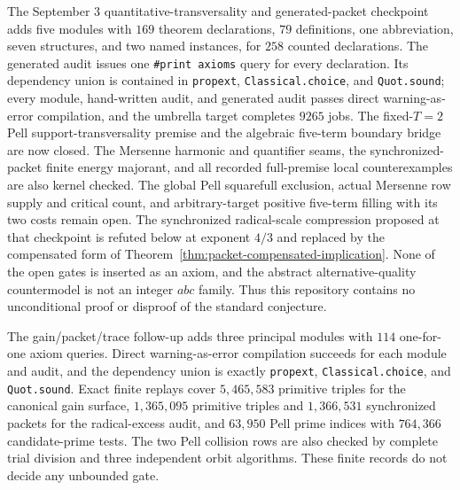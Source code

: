 \documentclass[11pt]{amsart}
\theoremstyle{definition}
\theoremstyle{remark}
\begin{document}
The September 3 quantitative-transversality and generated-packet checkpoint
adds five modules with $169$ theorem declarations, $79$ definitions, one
abbreviation, seven structures, and two named instances, for $258$ counted
declarations.  The generated audit issues one \texttt{\#print axioms} query
for every declaration.  Its dependency union is contained in
\texttt{propext}, \texttt{Classical.choice}, and \texttt{Quot.sound}; every
module, hand-written audit, and generated audit passes direct
warning-as-error compilation, and the umbrella target completes $9265$ jobs.
The fixed-$T=2$ Pell support-transversality premise and the algebraic
five-term boundary bridge are now closed.  The Mersenne harmonic and
quantifier seams, the synchronized-packet finite energy majorant, and all
recorded full-premise local counterexamples are also kernel checked.  The
global Pell squarefull exclusion, actual Mersenne row supply and critical
count, and arbitrary-target positive five-term filling with its two costs
remain open.  The synchronized radical-scale compression proposed at that
checkpoint is refuted below at exponent $4/3$ and replaced by the compensated
form of Theorem~\ref{thm:packet-compensated-implication}.  None of the open
gates is inserted as an axiom, and the abstract alternative-quality
countermodel is not an integer $abc$ family.  Thus this repository contains
no unconditional proof or disproof of the standard conjecture.

The gain/packet/trace follow-up adds three principal modules with $114$
one-for-one axiom queries.  Direct warning-as-error compilation succeeds for
each module and audit, and the dependency union is exactly
\texttt{propext}, \texttt{Classical.choice}, and \texttt{Quot.sound}.  Exact
finite replays cover $5{,}465{,}583$ primitive triples for the canonical gain
surface, $1{,}365{,}095$ primitive triples and $1{,}366{,}531$ synchronized
packets for the radical-excess audit, and $63{,}950$ Pell prime indices with
$764{,}366$ candidate-prime tests.  The two Pell collision rows are also
checked by complete trial division and three independent orbit algorithms.
These finite records do not decide any unbounded gate.
\end{document}
